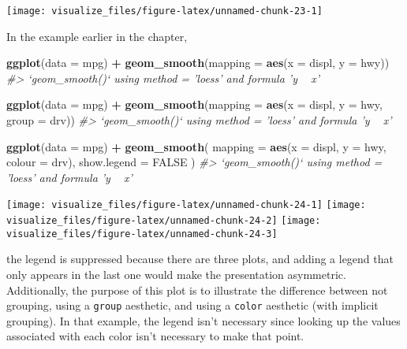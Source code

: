 \documentclass[]{book}
\newenvironment{Shaded}{\begin{snugshade}}{\end{snugshade}}
\newcommand{\CommentTok}[1]{\textcolor[rgb]{0.56,0.35,0.01}{\textit{#1}}}
\newcommand{\DataTypeTok}[1]{\textcolor[rgb]{0.13,0.29,0.53}{#1}}
\newcommand{\KeywordTok}[1]{\textcolor[rgb]{0.13,0.29,0.53}{\textbf{#1}}}
\newcommand{\NormalTok}[1]{#1}
\newcommand{\OperatorTok}[1]{\textcolor[rgb]{0.81,0.36,0.00}{\textbf{#1}}}
\newcommand{\OtherTok}[1]{\textcolor[rgb]{0.56,0.35,0.01}{#1}}
\newcommand{\StringTok}[1]{\textcolor[rgb]{0.31,0.60,0.02}{#1}}
\theoremstyle{plain}
\theoremstyle{remark}
\begin{document}
\begin{center}\texttt{[image: visualize\_files/figure-latex/unnamed-chunk-23-1]} \end{center}

In the example earlier in the chapter,

\begin{Shaded}
\begin{Highlighting}[]
\KeywordTok{ggplot}\NormalTok{(}\DataTypeTok{data =}\NormalTok{ mpg) }\OperatorTok{+}
\StringTok{  }\KeywordTok{geom_smooth}\NormalTok{(}\DataTypeTok{mapping =} \KeywordTok{aes}\NormalTok{(}\DataTypeTok{x =}\NormalTok{ displ, }\DataTypeTok{y =}\NormalTok{ hwy))}
\CommentTok{#> `geom_smooth()` using method = 'loess' and formula 'y ~ x'}

\KeywordTok{ggplot}\NormalTok{(}\DataTypeTok{data =}\NormalTok{ mpg) }\OperatorTok{+}
\StringTok{  }\KeywordTok{geom_smooth}\NormalTok{(}\DataTypeTok{mapping =} \KeywordTok{aes}\NormalTok{(}\DataTypeTok{x =}\NormalTok{ displ, }\DataTypeTok{y =}\NormalTok{ hwy, }\DataTypeTok{group =}\NormalTok{ drv))}
\CommentTok{#> `geom_smooth()` using method = 'loess' and formula 'y ~ x'}

\KeywordTok{ggplot}\NormalTok{(}\DataTypeTok{data =}\NormalTok{ mpg) }\OperatorTok{+}
\StringTok{  }\KeywordTok{geom_smooth}\NormalTok{(}
    \DataTypeTok{mapping =} \KeywordTok{aes}\NormalTok{(}\DataTypeTok{x =}\NormalTok{ displ, }\DataTypeTok{y =}\NormalTok{ hwy, }\DataTypeTok{colour =}\NormalTok{ drv),}
    \DataTypeTok{show.legend =} \OtherTok{FALSE}
\NormalTok{  )}
\CommentTok{#> `geom_smooth()` using method = 'loess' and formula 'y ~ x'}
\end{Highlighting}
\end{Shaded}

\begin{center}\texttt{[image: visualize\_files/figure-latex/unnamed-chunk-24-1]} \texttt{[image: visualize\_files/figure-latex/unnamed-chunk-24-2]} \texttt{[image: visualize\_files/figure-latex/unnamed-chunk-24-3]} \end{center}

the legend is suppressed because there are three plots, and adding a
legend that only appears in the last one would make the presentation
asymmetric. Additionally, the purpose of this plot is to illustrate the
difference between not grouping, using a \texttt{group} aesthetic, and
using a \texttt{color} aesthetic (with implicit grouping). In that
example, the legend isn't necessary since looking up the values
associated with each color isn't necessary to make that point.
\end{document}
